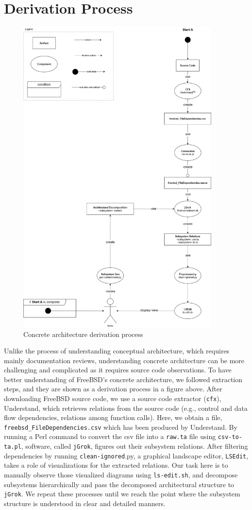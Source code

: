 \documentclass[12pt, dvipsnames, a4paper]{article}
\newcommand{\code}[1]{\texttt{#1}}
\begin{document}
\section{Derivation Process}
\begin{figure}[!htb]
	\center
	\includegraphics[width = 290pt]{assets/derivation_diagram.png}
	\caption{Concrete architecture derivation process \cite{derivation}}
\end{figure}
Unlike the process of understanding conceptual architecture, which requires mainly documentation reviews, understanding concrete architecture can be more challenging and complicated as it requires source code observations. To have better understanding of FreeBSD’s concrete architecture, we followed extraction steps, and they are shown as a derivation process in a figure above.
After downloading FreeBSD source code, we use a source code extractor (\code{cfx}), Understand, which retrieves relations from the source code (e.g., control and data flow dependencies, relations among function calls). Here, we obtain a file, \code{freebsd\_FileDependencies.csv} which has been produced by Understand. By running a Perl command to convert the csv file into a \code{raw.ta} file using \code{csv-to-ta.pl}, software, called \code{jGrok}, figures out their subsystem relations. After filtering dependencies by running \code{clean-ignored}.py, a graphical landscape editor, \code{LSEdit}, takes a role of visualizations for the extracted relations. Our task here is to manually observe those visualized diagrams using \code{ls-edit.sh}, and decompose subsystems hierarchically and pass the decomposed architectural structure to \code{jGrok}. We repeat these processes until we reach the point where the subsystem structure is understood in clear and detailed manners.
\clearpage
\end{document}
